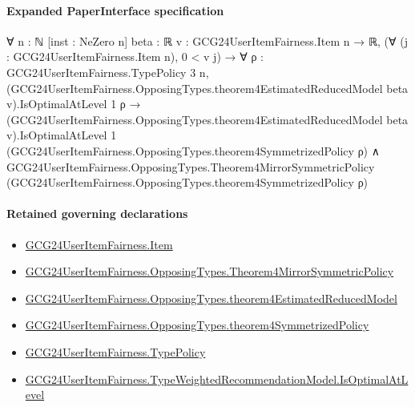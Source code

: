\documentclass[10pt]{article}
\begin{document}
\paragraph{Expanded PaperInterface specification}
\begin{ReviewVerbatim}
∀ {n : ℕ} [inst : NeZero n] {beta : ℝ} {v : GCG24UserItemFairness.Item n → ℝ},
  (∀ (j : GCG24UserItemFairness.Item n), 0 < v j) →
    ∀ {ρ : GCG24UserItemFairness.TypePolicy 3 n},
      (GCG24UserItemFairness.OpposingTypes.theorem4EstimatedReducedModel beta v).IsOptimalAtLevel 1 ρ →
        (GCG24UserItemFairness.OpposingTypes.theorem4EstimatedReducedModel beta v).IsOptimalAtLevel 1
            (GCG24UserItemFairness.OpposingTypes.theorem4SymmetrizedPolicy ρ) ∧
          GCG24UserItemFairness.OpposingTypes.Theorem4MirrorSymmetricPolicy
            (GCG24UserItemFairness.OpposingTypes.theorem4SymmetrizedPolicy ρ)
\end{ReviewVerbatim}

\paragraph{Retained governing declarations}
\begin{itemize}\raggedright
\item \hyperlink{governing-declaration-a7c560a429c6e204}{GCG24\allowbreak{}User\allowbreak{}Item\allowbreak{}Fairness.\allowbreak{}Item}
\item \hyperlink{governing-declaration-00d15cf288402d6b}{GCG24\allowbreak{}User\allowbreak{}Item\allowbreak{}Fairness.\allowbreak{}Opposing\allowbreak{}Types.\allowbreak{}Theorem4\allowbreak{}Mirror\allowbreak{}Symmetric\allowbreak{}Policy}
\item \hyperlink{governing-declaration-4861612962fb5ac5}{GCG24\allowbreak{}User\allowbreak{}Item\allowbreak{}Fairness.\allowbreak{}Opposing\allowbreak{}Types.\allowbreak{}theorem4\allowbreak{}Estimated\allowbreak{}Reduced\allowbreak{}Model}
\item \hyperlink{governing-declaration-b3b7c9d887398f6a}{GCG24\allowbreak{}User\allowbreak{}Item\allowbreak{}Fairness.\allowbreak{}Opposing\allowbreak{}Types.\allowbreak{}theorem4\allowbreak{}Symmetrized\allowbreak{}Policy}
\item \hyperlink{governing-declaration-dc7776cb642fa9dc}{GCG24\allowbreak{}User\allowbreak{}Item\allowbreak{}Fairness.\allowbreak{}Type\allowbreak{}Policy}
\item \hyperlink{governing-declaration-776fa5edd47b0ce5}{GCG24\allowbreak{}User\allowbreak{}Item\allowbreak{}Fairness.\allowbreak{}Type\allowbreak{}Weighted\allowbreak{}Recommendation\allowbreak{}Model.\allowbreak{}Is\allowbreak{}Optimal\allowbreak{}At\allowbreak{}Level}
\end{itemize}
\end{document}
